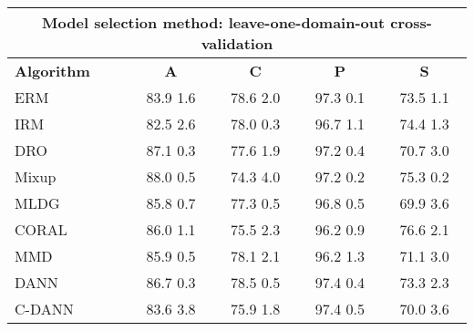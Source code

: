 \documentclass{article}
\begin{document}
\begin{center}
\begin{tabular}{lcccc}
\toprule
\multicolumn{5}{c}{\textbf{Model selection method: leave-one-domain-out cross-validation}} \\
\midrule
\textbf{Algorithm}    & \textbf{A}                & \textbf{C}                & \textbf{P}                & \textbf{S}                \\
\midrule
ERM                       & 83.9  1.6            & 78.6  2.0            & 97.3  0.1            & 73.5  1.1            \\
IRM                       & 82.5  2.6            & 78.0  0.3            & 96.7  1.1            & 74.4  1.3            \\
DRO                 & 87.1  0.3            & 77.6  1.9            & 97.2  0.4            & 70.7  3.0            \\
Mixup                     & 88.0  0.5            & 74.3  4.0            & 97.2  0.2            & 75.3  0.2            \\
MLDG                      & 85.8  0.7            & 77.3  0.5            & 96.8  0.5            & 69.9  3.6            \\
CORAL                     & 86.0  1.1            & 75.5  2.3            & 96.2  0.9            & 76.6  2.1            \\
MMD                       & 85.9  0.5            & 78.1  2.1            & 96.2  1.3            & 71.1  3.0            \\
DANN                       & 86.7  0.3            & 78.5  0.5            & 97.4  0.4            & 73.3  2.3            \\
C-DANN                   & 83.6  3.8            & 75.9  1.8            & 97.4  0.5            & 70.0  3.6            \\
\bottomrule
\end{tabular}
\end{center}
\end{document}
